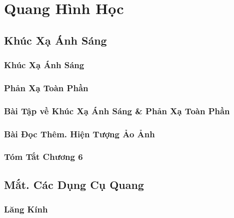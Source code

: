 \documentclass[oneside]{book}
\numberwithin{equation}{section}
\begin{document}
\part{Quang Hình Học}

\chapter{Khúc Xạ Ánh Sáng}

\section{Khúc Xạ Ánh Sáng}


\section{Phản Xạ Toàn Phần}


\section{Bài Tập về Khúc Xạ Ánh Sáng \& Phản Xạ Toàn Phần}


\section{Bài Đọc Thêm. Hiện Tượng Ảo Ảnh}


\section{Tóm Tắt Chương 6}


\chapter{Mắt. Các Dụng Cụ Quang}

\section{Lăng Kính}
\end{document}
